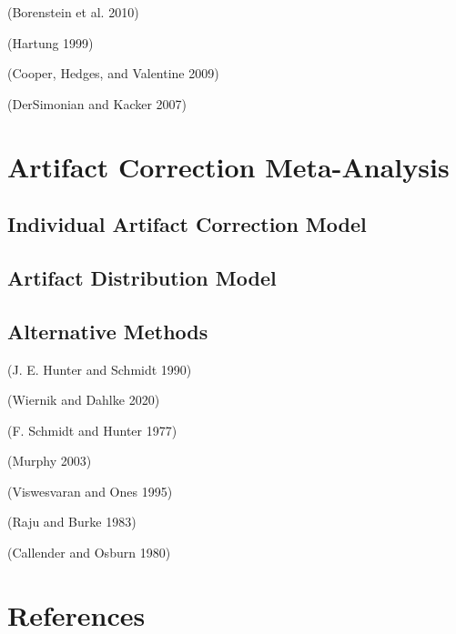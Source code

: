 \documentclass[
  letterpaper,
  DIV=11,
  numbers=noendperiod]{scrreprt}
\begin{document}
(Borenstein et al. 2010)

(Hartung 1999)

(Cooper, Hedges, and Valentine 2009)

(DerSimonian and Kacker 2007)

\hypertarget{artifact-correction-meta-analysis}{%
\chapter{Artifact Correction
Meta-Analysis}\label{artifact-correction-meta-analysis}}

\hypertarget{individual-artifact-correction-model}{%
\section{Individual Artifact Correction
Model}\label{individual-artifact-correction-model}}

\hypertarget{artifact-distribution-model}{%
\section{Artifact Distribution
Model}\label{artifact-distribution-model}}

\hypertarget{alternative-methods}{%
\section{Alternative Methods}\label{alternative-methods}}

(J. E. Hunter and Schmidt 1990)

(Wiernik and Dahlke 2020)

(F. Schmidt and Hunter 1977)

(Murphy 2003)

(Viswesvaran and Ones 1995)

(Raju and Burke 1983)

(Callender and Osburn 1980)


\hypertarget{references-1}{%
\chapter*{References}\label{references-1}}

\end{document}

